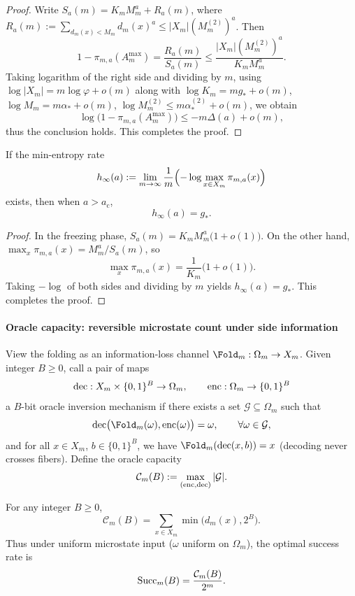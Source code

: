 \begin{proof}
Write \(S_a(m)=K_mM_m^a+R_a(m)\), where
\(
R_a(m):=\sum_{d_m(x)<M_m} d_m(x)^a\le |X_m|(M_m^{(2)})^a
\).
Then
\[
1-\pi_{m,a}(A_m^{\max})
=\frac{R_a(m)}{S_a(m)}
\le \frac{|X_m|(M_m^{(2)})^a}{K_mM_m^a}.
\]
Taking logarithm of the right side and dividing by \(m\), using \(\log|X_m|=m\log\varphi+o(m)\) along with \(\log K_m=mg_*+o(m)\), \(\log M_m=m\alpha_*+o(m)\),
\(\log M_m^{(2)}\le m\alpha_*^{(2)}+o(m)\), we obtain
\[
\log\bigl(1-\pi_{m,a}(A_m^{\max})\bigr)
\le -m\Delta(a)+o(m),
\]
thus the conclusion holds. This completes the proof.
\end{proof}

\begin{corollary}\label{cor:fold-escort-minentropy-rate}
If the min-entropy rate
\[
h_\infty(a):=\lim_{m\to\infty}\frac{1}{m}\Bigl(-\log\max_{x\in X_m}\pi_{m,a}(x)\Bigr)
\]
exists, then when \(a>a_{\mathrm c}\),
\[
h_\infty(a)=g_*.
\]
\end{corollary}

\begin{proof}
In the freezing phase, \(S_a(m)=K_mM_m^a\bigl(1+o(1)\bigr)\).
On the other hand, \(\max_x\pi_{m,a}(x)=M_m^a/S_a(m)\), so
\[
\max_x\pi_{m,a}(x)=\frac{1}{K_m}\bigl(1+o(1)\bigr).
\]
Taking \(-\log\) of both sides and dividing by \(m\) yields \(h_\infty(a)=g_*\). This completes the proof.
\end{proof}

\paragraph{Oracle capacity: reversible microstate count under side information}
View the folding as an information-loss channel \(\Fold_m:\Omega_m\to X_m\).
Given integer \(B\ge 0\), call a pair of maps
\[
{\rm dec}:X_m\times\{0,1\}^B\to\Omega_m,\qquad
{\rm enc}:\Omega_m\to\{0,1\}^B
\]
a \(B\)-bit oracle inversion mechanism if there exists a set \(\mathcal{G}\subseteq\Omega_m\) such that
\[
{\rm dec}\bigl(\Fold_m(\omega),{\rm enc}(\omega)\bigr)=\omega,\qquad \forall \omega\in\mathcal{G},
\]
and for all \(x\in X_m\), \(b\in\{0,1\}^B\), we have \(\Fold_m({\rm dec}(x,b))=x\) (decoding never crosses fibers).
Define the oracle capacity
\[
\mathcal{C}_m(B):=\max_{({\rm enc},{\rm dec})}|\mathcal{G}|.
\]

\begin{theorem}\label{thm:fold-oracle-capacity-closed-form}
For any integer \(B\ge 0\),
\[
\mathcal{C}_m(B)=\sum_{x\in X_m}\min\bigl(d_m(x),2^B\bigr).
\]
Thus under uniform microstate input (\(\omega\) uniform on \(\Omega_m\)), the optimal success rate is
\[
{\rm Succ}_m(B)=\frac{\mathcal{C}_m(B)}{2^m}.
\]
\end{theorem}

